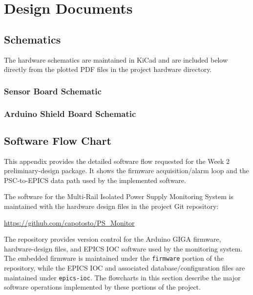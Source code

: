 \chapter{Design Documents}
\label{chap:design_documents}
\section{Schematics}
The hardware schematics are maintained in KiCad and are included
below directly from the plotted PDF files in the project hardware directory.

\subsection{Sensor Board Schematic}



\subsection{Arduino Shield Board Schematic}




\newpage
\section{Software Flow Chart}
This appendix provides the detailed software flow requested for the Week 2
preliminary-design package. It shows the firmware acquisition/alarm loop and the
PSC-to-EPICS data path used by the implemented software.

The software for the Multi-Rail Isolated Power Supply Monitoring System is
maintained with the hardware design files in the project Git repository:

\begin{center}
    \url{https://github.com/capotosto/PS_Monitor}
\end{center}

The repository provides version control for the Arduino GIGA firmware,
hardware-design files, and EPICS IOC software used by the monitoring system.
The embedded firmware is maintained under the \texttt{firmware} portion of the
repository, while the EPICS IOC and associated database/configuration files are
maintained under \texttt{epics-ioc}. The flowcharts in this section describe
the major software operations implemented by these portions of the project.


